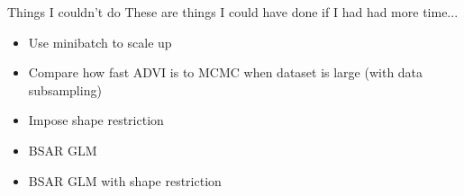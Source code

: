 \documentclass[color=usernames,dvipsnames]{beamer}
\begin{document}
\begin{frame}{Things I couldn't do}
  These are things I could have done if I had had more time...
  \begin{itemize}
    \item Use minibatch to scale up
    \item Compare how fast ADVI is to MCMC when dataset is large (with data subsampling)
    \item Impose shape restriction
    \item BSAR GLM
    \item BSAR GLM with shape restriction
  \end{itemize}
\end{frame}
\end{document}
